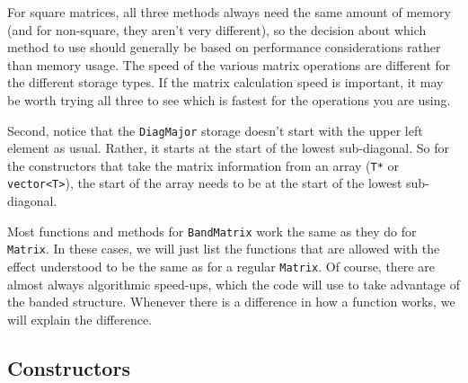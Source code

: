 \documentclass[twoside,letterpaper,11pt]{article}
\renewcommand{\tt}[1]{{\lstinline {#1}}}
\begin{document}
For square matrices, all three methods always need the same amount of memory 
(and for non-square, they aren't very different), so the 
decision about which method to use should generally be based on performance 
considerations rather than memory usage.
The speed of the various matrix operations are different for the different storage 
types.  If the matrix calculation speed is important, it may be worth trying 
all three to see which is fastest for the operations you are using.

Second, notice that the \tt{DiagMajor} storage doesn't start with the 
upper left element as usual.
Rather, it starts at the start of the lowest sub-diagonal.  
So for the constructors that 
take the matrix information from an array (\tt{T*} or \tt{vector<T>}), 
the start of the array needs to be at the start of the lowest sub-diagonal.  

Most functions and methods for \tt{BandMatrix} 
work the same as they do for \tt{Matrix}.
In these cases, we will just list the functions that are allowed with the
effect understood to be the same as for a regular \tt{Matrix}.  Of course, there are 
almost always algorithmic speed-ups, which the code will use to take advantage of the 
banded structure.
Whenever there is a difference in how a function works,
we will explain the difference.


\subsection{Constructors}
\label{BandMatrix_Constructors}
\end{document}
